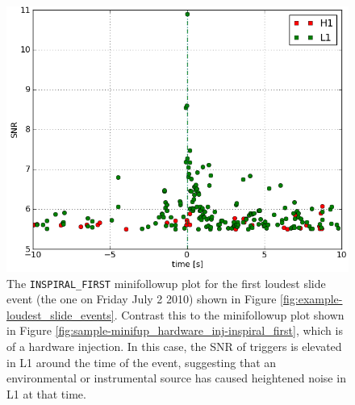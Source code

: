 \begin{figure}[p]
\center
\label{fig:sample-minifup_slide}
\includegraphics[width=4.8in]{figures/slide-loudest_events/H1L1-FULL_DATA_CAT_3_VETO_FULL_DATA_map-INSPIRAL_FIRST-3_LOUDEST_SLIDE_EVENTS_BY_COMBINED_FAR_SUMMARY-961545543-3628944.png}
\caption{The \texttt{INSPIRAL\_FIRST} minifollowup plot for the first loudest
slide event (the one on Friday July 2 2010) shown in Figure
\ref{fig:example-loudest_slide_events}. Contrast this to the minifollowup plot
shown in Figure \ref{fig:sample-minifup_hardware_inj-inspiral_first}, which is
of a hardware injection. In this case, the SNR of triggers is elevated in L1
around the time of the event, suggesting that an environmental or instrumental
source has caused heightened noise in L1 at that time.}
\end{figure}

